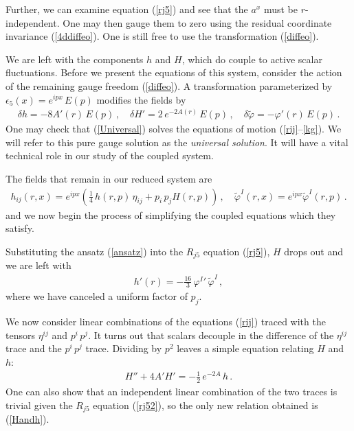 \documentclass[a4paper,12pt]{article}
\def\varphit{\tilde{\varphi}}
\begin{document}
Further, we can examine equation (\ref{rj5}) and see that the $a^x$
must be $r$-independent.  One may then gauge them to zero using the
residual coordinate invariance (\ref{4ddiffeo}).  One is still free to
use the transformation (\ref{diffeo}).

We are left with the components $h$ and $H$, which do couple to active
scalar fluctuations.  Before we present the equations of
this system, consider the action of the remaining gauge freedom
(\ref{diffeo}).  A transformation parameterized by $\epsilon_5(x) =
e^{ipx} \, E(p)$ modifies the fields by
\begin{eqnarray}
\label{Universal}
\delta h = - 8 A'(r) \, E(p) \,, \quad \delta H' = 2 \, e^{-2A(r)} \,
E(p)\,, \quad \delta \varphit = - \varphi'(r) \, E(p)\,.
\end{eqnarray}
One may check that (\ref{Universal}) solves the equations of motion
(\ref{rij}--\ref{kg}).  We will refer to
this pure gauge solution as the {\em universal solution}.  It will
have a vital technical role in our study of the coupled system.





The fields that remain in our reduced system are
\begin{eqnarray}
\label{ansatz}
h_{ij} (r,x) = e^{ipx} \left( \frac{1}{4} \, h(r,p) \, \eta_{ij} + p_i
\, p_j H(r,p) \right) \,, \quad \varphit^I(r, x) = e^{ipx}
\varphit^I(r,p) \,.
\end{eqnarray}
and we now begin the process of simplifying the coupled equations which they
satisfy.

Substituting the ansatz (\ref{ansatz}) into the $R_{j5}$ equation
(\ref{rj5}), $H$ drops out and we are left with
\begin{eqnarray}
\label{rj52}
h'(r) = - \frac{16}{3} \, \varphi^I{}' \, \varphit^I \,,
\end{eqnarray}
where we have canceled a uniform factor of $p_j$.  

We now consider linear combinations of the equations (\ref{rij})
traced with the tensors $\eta^{ij}$ and $p^i \, p^j$.  It turns out
that scalars decouple in the difference of the $\eta^{ij}$ trace and
the $p^i \, p^j$ trace. Dividing by $p^2$ leaves a simple equation
relating $H$ and $h$:
\begin{eqnarray}
\label{Handh}
H'' + 4 A' H' = - \frac{1}{2} \, e^{-2A} \, h \,.
\end{eqnarray}
One can also show that an independent linear combination of the two traces
is trivial given the $R_{j5}$
equation (\ref{rj52}), so the only new relation obtained is
(\ref{Handh}).
\end{document}
